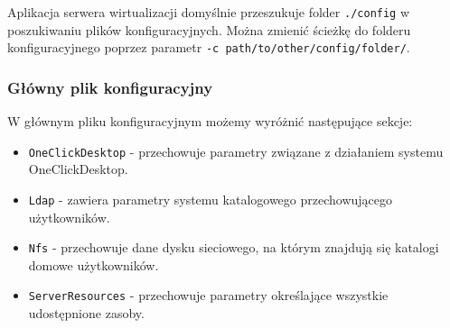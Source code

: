 \documentclass[../opis-rozwiazania.tex]{subfiles}
\begin{document}
Aplikacja serwera wirtualizacji domyślnie przeszukuje folder \texttt{./config} w poszukiwaniu plików konfiguracyjnych.
Można zmienić ścieżkę do folderu konfiguracyjnego poprzez parametr \texttt{-c\ path/to/other/config/folder/}.

\subsubsection{Główny plik konfiguracyjny}
W głównym pliku konfiguracyjnym możemy wyróżnić następujące sekcje:
\begin{itemize}
  \item \texttt{OneClickDesktop} - przechowuje parametry związane z działaniem systemu OneClickDesktop.
  \item \texttt{Ldap} - zawiera parametry systemu katalogowego przechowującego użytkowników.
  \item \texttt{Nfs} - przechowuje dane dysku sieciowego, na którym znajdują się katalogi domowe użytkowników.
  \item \texttt{ServerResources} - przechowuje parametry określające wszystkie udostępnione zasoby.
\end{itemize}
\end{document}
